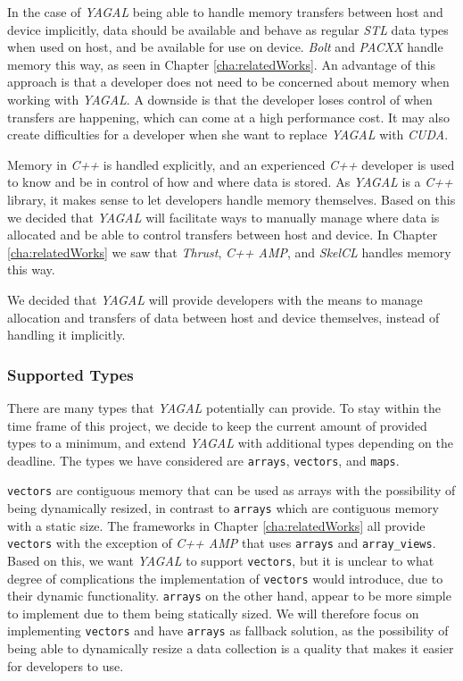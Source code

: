 In the case of \textit{YAGAL} being able to handle memory transfers between host and device implicitly, data should be available and behave as regular \textit{STL} data types when used on host, and be available for use on device. \textit{Bolt} and \textit{PACXX} handle memory this way, as seen in Chapter \ref{cha:relatedWorks}. An advantage of this approach is that a developer does not need to be concerned about memory when working with \textit{YAGAL}. A downside is that the developer loses control of when transfers are happening, which can come at a high performance cost. It may also create difficulties for a developer when she want to replace \textit{YAGAL} with \textit{CUDA}.

Memory in \textit{C++} is handled explicitly, and an experienced \textit{C++} developer is used to know and be in control of how and where data is stored. As \textit{YAGAL} is a \textit{C++} library, it makes sense to let developers handle memory themselves. Based on this we decided that \textit{YAGAL} will facilitate ways to manually manage where data is allocated and be able to control transfers between host and device. In Chapter \ref{cha:relatedWorks} we saw that \textit{Thrust}, \textit{C++ AMP}, and \textit{SkelCL} handles memory this way.

We decided that \textit{YAGAL} will provide developers with the means to manage allocation and transfers of data between host and device themselves, instead of handling it implicitly.

\subsubsection{Supported Types}
There are many types that \textit{YAGAL} potentially can provide. To stay within the time frame of this project, we decide to keep the current amount of provided types to a minimum, and extend \textit{YAGAL} with additional types depending on the deadline. The types we have considered are \texttt{arrays}, \texttt{vectors}, and \texttt{maps}.

\texttt{vectors} are contiguous memory that can be used as arrays with the possibility of being dynamically resized, in contrast to \texttt{arrays} which are contiguous memory with a static size. The frameworks in Chapter \ref{cha:relatedWorks} all provide \texttt{vectors} with the exception of \textit{C++ AMP} that uses \texttt{arrays} and \texttt{array\_views}. Based on this, we want \textit{YAGAL} to support \texttt{vectors}, but it is unclear to what degree of complications the implementation of \texttt{vectors} would introduce, due to their dynamic functionality. \texttt{arrays} on the other hand, appear to be more simple to implement due to them being statically sized. We will therefore focus on implementing \texttt{vectors} and have \texttt{arrays} as fallback solution, as the possibility of being able to dynamically resize a data collection is a quality that makes it easier for developers to use.

